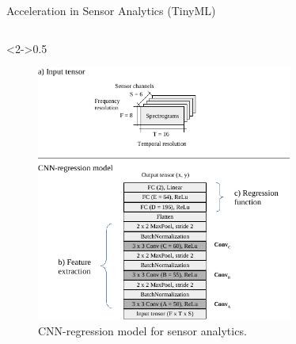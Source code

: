 \begin{frame}{Acceleration in Sensor Analytics (TinyML)}
\begin{columns}[c]
		\begin{column}<2->{0.5\textwidth}
			\begin{figure}
				\includegraphics[width=0.75\textwidth]{../chapters/cnn_accelerator/figures/models.pdf} %
				\caption{\scriptsize CNN-regression model for sensor analytics.}
			\end{figure}
		\end{column}
		
	\end{columns}
\end{frame}

